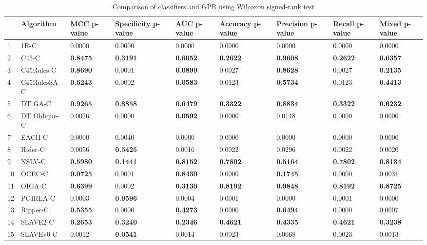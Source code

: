 \begin{table}
\footnotesize
\caption{Comparison of classifiers and GPR using Wilcoxon signed-rank test}
\label{tab:wilcoxon comparison}
\begin{tabular}{lllllllll}
\hline
 & Algorithm & MCC p-value & Specificity p-value & AUC p-value & Accuracy p-value & Precision p-value & Recall p-value & Mixed p-value \\
\hline
1 & 1R-C & 0.0000 & 0.0000 & 0.0000 & 0.0000 & 0.0000 & 0.0000 & 0.0000 \\
2 & C45-C & \textbf{0.8475} & \textbf{0.3191} & \textbf{0.6052} & \textbf{0.2622} & \textbf{0.9608} & \textbf{0.2622} & \textbf{0.6357} \\
3 & C45Rules-C & \textbf{0.8690} & 0.0001 & \textbf{0.0899} & 0.0027 & \textbf{0.8628} & 0.0027 & \textbf{0.2135} \\
4 & C45RulesSA-C & \textbf{0.6243} & 0.0002 & \textbf{0.0583} & 0.0123 & \textbf{0.5734} & 0.0123 & \textbf{0.4413} \\
5 & DT GA-C & \textbf{0.9265} & \textbf{0.8858} & \textbf{0.6479} & \textbf{0.3322} & \textbf{0.8834} & \textbf{0.3322} & \textbf{0.6232} \\
6 & DT Oblique-C & 0.0026 & 0.0000 & \textbf{0.0592} & 0.0000 & 0.0148 & 0.0000 & 0.0000 \\
7 & EACH-C & 0.0000 & 0.0040 & 0.0000 & 0.0000 & 0.0000 & 0.0000 & 0.0000 \\
8 & Hider-C & 0.0056 & \textbf{0.5425} & 0.0016 & 0.0022 & 0.0296 & 0.0022 & 0.0020 \\
9 & NSLV-C & \textbf{0.5980} & \textbf{0.1441} & \textbf{0.8152} & \textbf{0.7802} & \textbf{0.5164} & \textbf{0.7802} & \textbf{0.8134} \\
10 & OCEC-C & \textbf{0.0725} & 0.0001 & \textbf{0.8430} & 0.0000 & \textbf{0.1745} & 0.0000 & 0.0031 \\
11 & OIGA-C & \textbf{0.6399} & 0.0002 & \textbf{0.3130} & \textbf{0.8192} & \textbf{0.9848} & \textbf{0.8192} & \textbf{0.8725} \\
12 & PGIRLA-C & 0.0003 & \textbf{0.9596} & 0.0004 & 0.0001 & 0.0000 & 0.0001 & 0.0000 \\
13 & Ripper-C & \textbf{0.5355} & 0.0000 & \textbf{0.4273} & 0.0000 & \textbf{0.6494} & 0.0000 & 0.0007 \\
14 & SLAVE2-C & \textbf{0.2653} & \textbf{0.3240} & \textbf{0.2346} & \textbf{0.4621} & \textbf{0.4335} & \textbf{0.4621} & \textbf{0.3238} \\
15 & SLAVEv0-C & 0.0012 & \textbf{0.0541} & 0.0014 & 0.0023 & 0.0068 & 0.0023 & 0.0013 \\
\hline
\end{tabular}
\end{table}
